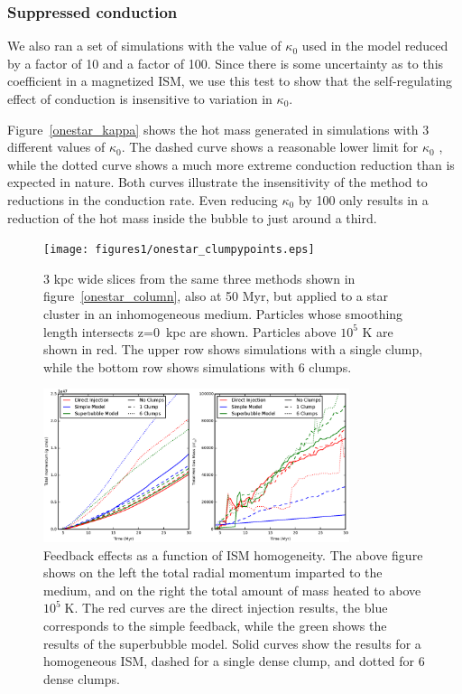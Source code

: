 \subsubsection{Suppressed conduction}

We also ran a set of simulations with the value of $\kappa_0$ used in the model
reduced by a factor of 10 and a factor of 100.  Since there is some uncertainty
as to this coefficient in a magnetized ISM, we use this test to show that the
self-regulating effect of conduction is insensitive to variation in $\kappa_0$.

Figure~\ref{onestar_kappa} shows the hot mass generated in simulations with 3
different values of $\kappa_0$.  The dashed curve shows a reasonable lower limit
for $\kappa_0$ \citep{Cowie1977}, while the dotted curve shows a much more
extreme conduction reduction than is expected in nature.  Both curves illustrate
the insensitivity of the method to reductions in the conduction rate.  Even
reducing $\kappa_0$ by 100 only results in a reduction of the hot mass inside
the bubble to just around a third.  


\begin{figure}
    \texttt{[image: figures1/onestar\_clumpypoints.eps]}
    \caption[Image of superbubbles in a clumpy ISM]{3 kpc wide slices
    from the same three methods shown in figure~\ref{onestar_column}, also at 50
    Myr, but applied to a star cluster in an inhomogeneous medium.  Particles
    whose smoothing length intersects z=0~kpc are shown.  Particles above $10^5$
    K are shown in red.  The upper row shows simulations with a single clump,
    while the bottom row shows simulations with 6 clumps.}
    \label{onestar_clumpyslice}
\end{figure}

\begin{figure}
    \includegraphics[width=0.8\textwidth]{figures1/onestar_clumpy.eps}
    \caption[Feedback effects as a function of ISM homogeneity]{Feedback effects
    as a function of ISM homogeneity.  The above figure shows on the left the
    total radial momentum imparted to the medium, and on the right the total
    amount of mass heated to above $10^5\;\mathrm{K}$.  The red curves are the
    direct injection results, the blue corresponds to the simple feedback, while
    the green shows the results of the superbubble model.  Solid curves show the
    results for a homogeneous ISM, dashed for a single dense clump, and dotted
    for 6 dense clumps.}
    \label{onestar_clumpy}
\end{figure}

